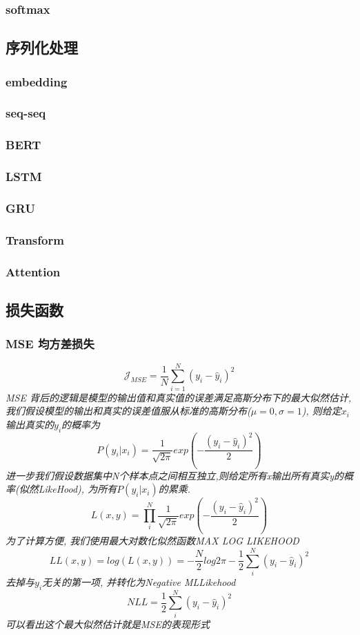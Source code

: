 \documentclass{scrartcl}
\numberwithin{equation}{section}   %
\begin{document}
\subsubsection{softmax}

\subsection{序列化处理}
\subsubsection{embedding}
\subsubsection{seq-seq}
\subsubsection{BERT}
\subsubsection{LSTM}
\subsubsection{GRU}
\subsubsection{Transform}
\subsubsection{Attention}
\subsection{损失函数}
\subsubsection{MSE 均方差损失}
\textsl{
    $$\mathcal{J}_{MSE} = \frac{1}{N}\sum_{i=1}^N{(y_i - \hat{y}_i)^2} $$
MSE 背后的逻辑是模型的输出值和真实值的误差满足高斯分布下的最大似然估计, 我们假设模型的输出和真实的误差值服从标准的高斯分布($\mu=0, \sigma=1$), 则给定$x_i$输出真实的$y_i$的概率为$$P(y_i\vert x_i) = \frac{1}{\sqrt{2 \pi}}exp(- \frac{(y_i -  \hat{y}_i)^2}{2})$$进一步我们假设数据集中N个样本点之间相互独立,则给定所有x输出所有真实y的概率(似然LikeHood), 为所有$P(y_i\vert x_i)$的累乘. $$L(x,y) = \prod_i^N  \frac{1}{\sqrt{2 \pi}}exp(- \frac{(y_i -  \hat{y}_i)^2}{2})$$为了计算方便, 我们使用最大对数化似然函数MAX LOG LIKEHOOD$$LL(x,y) =  log(L(x,y)) = -\frac{N}{2}log{2\pi} -\frac{1}{2} \sum_i^N(y_i -\hat{y}_i)^2$$去掉与$y_i$无关的第一项, 并转化为Negative MLLikehood $$NLL= \frac{1}{2} \sum_i^N(y_i -\hat{y}_i)^2$$可以看出这个最大似然估计就是MSE的表现形式
}
\end{document}
